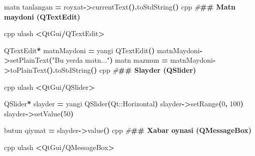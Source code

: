 \documentclass[a4paper,11pt,twoside,openright]{book}
\newenvironment{Shaded}{\begin{snugshade}}{\end{snugshade}}
\newcommand{\DecValTok}[1]{\textcolor[rgb]{0.00,0.00,0.81}{#1}}
\newcommand{\ErrorTok}[1]{\textcolor[rgb]{0.64,0.00,0.00}{\textbf{#1}}}
\newcommand{\ExtensionTok}[1]{#1}
\newcommand{\NormalTok}[1]{#1}
\newcommand{\OperatorTok}[1]{\textcolor[rgb]{0.81,0.36,0.00}{\textbf{#1}}}
\newcommand{\PreprocessorTok}[1]{\textcolor[rgb]{0.56,0.35,0.01}{\textit{#1}}}
\newcommand{\StringTok}[1]{\textcolor[rgb]{0.31,0.60,0.02}{#1}}
\begin{document}
\begin{Shaded}
\begin{Highlighting}[]
\NormalTok{matn tanlangan }\OperatorTok{=}\NormalTok{ royxat}\OperatorTok{{-}\textgreater{}}\NormalTok{currentText}\OperatorTok{().}\NormalTok{toStdString}\OperatorTok{()}
\ErrorTok{\textasciigrave{}\textasciigrave{}\textasciigrave{}}\NormalTok{cpp}
\PreprocessorTok{\#}\ErrorTok{\#\# Matn maydoni (\textasciigrave{}QTextEdit\textasciigrave{})}

\ErrorTok{\textasciigrave{}\textasciigrave{}\textasciigrave{}}\NormalTok{cpp}
\NormalTok{ulash }\OperatorTok{\textless{}}\NormalTok{QtGui}\OperatorTok{/}\ExtensionTok{QTextEdit}\OperatorTok{\textgreater{}}

\ExtensionTok{QTextEdit}\OperatorTok{*}\NormalTok{ matnMaydoni }\OperatorTok{=}\NormalTok{ yangi }\ExtensionTok{QTextEdit}\OperatorTok{()}
\NormalTok{matnMaydoni}\OperatorTok{{-}\textgreater{}}\NormalTok{setPlainText}\OperatorTok{(}\StringTok{"Bu yerda matn..."}\OperatorTok{)}
\NormalTok{matn mazmun }\OperatorTok{=}\NormalTok{ matnMaydoni}\OperatorTok{{-}\textgreater{}}\NormalTok{toPlainText}\OperatorTok{().}\NormalTok{toStdString}\OperatorTok{()}
\ErrorTok{\textasciigrave{}\textasciigrave{}\textasciigrave{}}\NormalTok{cpp}
\PreprocessorTok{\#}\ErrorTok{\#\# Slayder (\textasciigrave{}QSlider\textasciigrave{})}

\ErrorTok{\textasciigrave{}\textasciigrave{}\textasciigrave{}}\NormalTok{cpp}
\NormalTok{ulash }\OperatorTok{\textless{}}\NormalTok{QtGui}\OperatorTok{/}\ExtensionTok{QSlider}\OperatorTok{\textgreater{}}

\ExtensionTok{QSlider}\OperatorTok{*}\NormalTok{ slayder }\OperatorTok{=}\NormalTok{ yangi }\ExtensionTok{QSlider}\OperatorTok{(}\ExtensionTok{Qt::Horizontal}\OperatorTok{)}
\NormalTok{slayder}\OperatorTok{{-}\textgreater{}}\NormalTok{setRange}\OperatorTok{(}\DecValTok{0}\OperatorTok{,} \DecValTok{100}\OperatorTok{)}
\NormalTok{slayder}\OperatorTok{{-}\textgreater{}}\NormalTok{setValue}\OperatorTok{(}\DecValTok{50}\OperatorTok{)}

\NormalTok{butun qiymat }\OperatorTok{=}\NormalTok{ slayder}\OperatorTok{{-}\textgreater{}}\NormalTok{value}\OperatorTok{()}
\ErrorTok{\textasciigrave{}\textasciigrave{}\textasciigrave{}}\NormalTok{cpp}
\PreprocessorTok{\#}\ErrorTok{\#\# Xabar oynasi (\textasciigrave{}QMessageBox\textasciigrave{})}

\ErrorTok{\textasciigrave{}\textasciigrave{}\textasciigrave{}}\NormalTok{cpp}
\NormalTok{ulash }\OperatorTok{\textless{}}\NormalTok{QtGui}\OperatorTok{/}\ExtensionTok{QMessageBox}\OperatorTok{\textgreater{}}


\end{Highlighting}
\end{Shaded}
\end{document}
